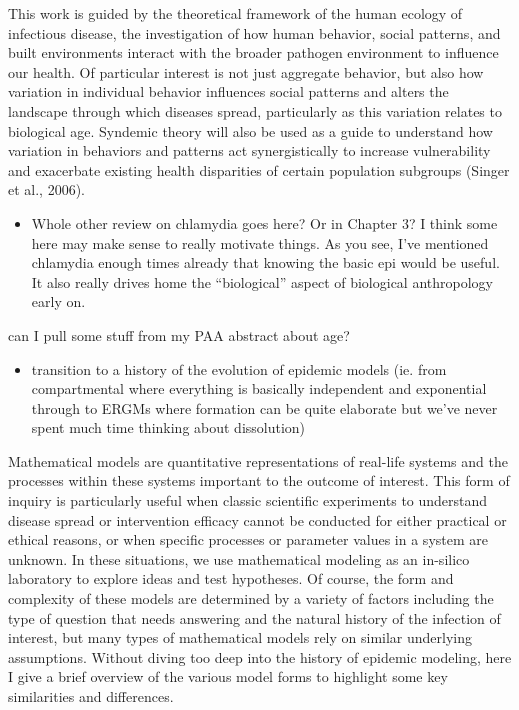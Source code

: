 \documentclass [11pt, proquest] {uwthesis}[2015/03/03]
\providecommand{\tightlist}{%
  \setlength{\itemsep}{0pt}\setlength{\parskip}{0pt}}
\begin{document}
This work is guided by the theoretical framework of the human ecology of infectious disease, the investigation of how human behavior, social patterns, and built environments interact with the broader pathogen environment to influence our health. Of particular interest is not just aggregate behavior, but also how variation in individual behavior influences social patterns and alters the landscape through which diseases spread, particularly as this variation relates to biological age. Syndemic theory will also be used as a guide to understand how variation in behaviors and patterns act synergistically to increase vulnerability and exacerbate existing health disparities of certain population subgroups (Singer et al., 2006).
\begin{itemize}
\tightlist
\item
  Whole other review on chlamydia goes here? Or in Chapter 3? I think some here may make sense to really motivate things. As you see, I've mentioned chlamydia enough times already that knowing the basic epi would be useful. It also really drives home the ``biological'' aspect of biological anthropology early on.
\end{itemize}
can I pull some stuff from my PAA abstract about age?
\begin{itemize}
\tightlist
\item
  transition to a history of the evolution of epidemic models (ie. from compartmental where everything is basically independent and exponential through to ERGMs where formation can be quite elaborate but we've never spent much time thinking about dissolution)
\end{itemize}
Mathematical models are quantitative representations of real-life systems and the processes within these systems important to the outcome of interest. This form of inquiry is particularly useful when classic scientific experiments to understand disease spread or intervention efficacy cannot be conducted for either practical or ethical reasons, or when specific processes or parameter values in a system are unknown. In these situations, we use mathematical modeling as an in-silico laboratory to explore ideas and test hypotheses. Of course, the form and complexity of these models are determined by a variety of factors including the type of question that needs answering and the natural history of the infection of interest, but many types of mathematical models rely on similar underlying assumptions. Without diving too deep into the history of epidemic modeling, here I give a brief overview of the various model forms to highlight some key similarities and differences.
\end{document}
